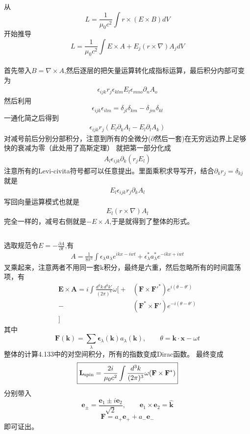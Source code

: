\documentclass{article}
\newcommand{\p}{\partial}
\newcommand{\e}{\epsilon}
\newcommand{\xd}{\nabla \times}%
\newcommand{\pdv}[2]{\frac{\partial #1}{\partial #2}}
\newcommand{\ti}{\times}
\newcommand{\de}{\delta}
\begin{document}
\subsection{}
从$$L=\frac{1}{\mu_0 c^2}\int r\ti (E\ti B)dV$$开始推导
$$L=\frac{1}{\mu_0 c^2}\int E\ti A+E_j (r\ti \nabla)A_jdV$$ \\
首先带入$B=\xd A$,然后逐层的把矢量运算转化成指标运算，最后积分内部可变为
\begin{align}
    \e_{ijk}r_j\e_{klm}E_l\e_{mno}\p_nA_o
\end{align}
然后利用$$\e_{ijk}\e_{ilm}=\de_{jl}\de_{km}-\de_{jm}\de_{kl}$$一通化简之后得到
\begin{align}
\e_{ijk}r_j(E_l\p_k A_l-E_l\p_l A_k)
\end{align}
对减号前后分别分部积分，注意到所有的全微分($\p \text{然后一套}$)在无穷远边界上足够快的衰减为零（此处用了高斯定理）
就把第一部分化成\begin{align}
    A_l\e_{ijk}\p_k(r_jE_l)
\end{align}
注意所有的Levi-civita符号都可以任意提出。里面乘积求导写开，结合$\p_k r_j=\de_{kj}$
就是\begin{align}
    E_l \e_{ijk}r_j\p_k A_l
\end{align}
写回向量运算模式也就是
\begin{align}
    E_l(r\ti \nabla)A_l
\end{align}
完全一样的，减号右侧就是$-E\ti A$,于是就得到了整体的形式。
\subsection{}
选取规范令$E=-\pdv{A}{t}$,有
\begin{align}
A=\frac{1}{8\pi^3}\int \e_\lambda a_\lambda e^{ikx-iwt}+\e^*_\lambda a^*_\lambda e^{-ikx+iwt}
\end{align}
叉乘起来，注意两者不用同一套k积分，最终是六重，然后忽略所有的时间震荡项，有
\[
\begin{aligned}
\mathbf E\times\mathbf A
=i\int\frac{d^3k\,d^3k'}{(2\pi)^6}\omega\Big[
+&(\mathbf F\times\mathbf F'^*)e^{i(\theta-\theta')}\\
-&(\mathbf F^*\times\mathbf F')e^{-i(\theta-\theta')}\\
\Big]
\end{aligned}
\]
其中\[
\mathbf F(\mathbf k)=\sum_{\lambda}\boldsymbol\epsilon_\lambda(\mathbf k)a_\lambda(\mathbf k),
\qquad
\theta=\mathbf k\cdot\mathbf x-\omega t
\]
整体的计算4.133中的对空间积分，所有的指数变成Dirac函数。
最终变成\[
\boxed{
\mathbf L_{\rm spin}
=\frac{2i}{\mu_0c^2}
\int\frac{d^3k}{(2\pi)^3}\omega
(\mathbf F\times\mathbf F^*)
}
\]分别带入\[
\mathbf e_\pm=\frac{\mathbf e_1\pm i\mathbf e_2}{\sqrt2},
\qquad
\mathbf e_1\times\mathbf e_2=\hat{\mathbf k}
\]\[
\mathbf F=a_+\mathbf e_++a_-\mathbf e_-
\]即可证出。
\end{document}
